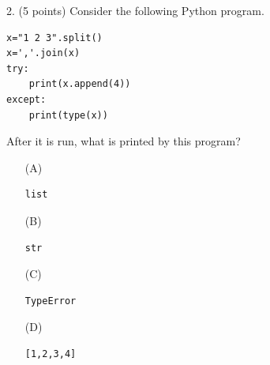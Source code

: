 \documentclass{article}
\begin{document}
\noindent
\begin{minipage}{\textwidth}
2. (5 points)
Consider the following Python program.
\begin{verbatim}
x="1 2 3".split()
x=','.join(x)
try:
    print(x.append(4))
except:
    print(type(x))
\end{verbatim}
After it is run, what is printed by this program?

\begin{enumerate}
\item[(A)]
\begin{verbatim}list\end{verbatim}

\item[(B)]
\begin{verbatim}str\end{verbatim}

\item[(C)]
\begin{verbatim}TypeError\end{verbatim}

\item[(D)]
\begin{verbatim}[1,2,3,4]\end{verbatim}

\end{enumerate}
\end{minipage}
\vspace{10em}
\filbreak\vfil{}\vfilneg
\end{document}
